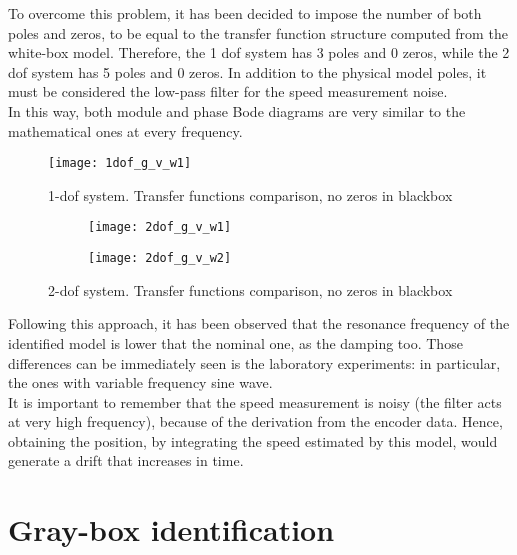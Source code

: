 To overcome this problem, it has been decided to impose the number of both poles and zeros, to be equal to the transfer function structure computed from the white-box model. Therefore, the 1 dof system has 3 poles and 0 zeros, while the 2 dof system has 5 poles and 0 zeros.
In addition to the physical model poles, it must be considered the low-pass filter for the speed measurement noise. \\
In this way, both module and phase Bode diagrams are very similar to the mathematical ones at every frequency.

\begin{figure*}[h]
	\centering
	\texttt{[image: 1dof\_g\_v\_w1]}
	\caption{1-dof system. Transfer functions comparison, no zeros in blackbox}
\end{figure*}

\begin{figure*}[h]
	\centering
	\begin{subfigure}{0.45\columnwidth}
		\texttt{[image: 2dof\_g\_v\_w1]}
	\end{subfigure}
	\begin{subfigure}{0.45\columnwidth}
		\texttt{[image: 2dof\_g\_v\_w2]}
	\end{subfigure}
	\caption{2-dof system. Transfer functions comparison, no zeros in blackbox}
\end{figure*}

Following this approach, it has been observed that the resonance frequency of the identified model is lower that the nominal one, as the damping too.
Those differences can be immediately seen is the laboratory experiments: in particular, the ones with variable frequency sine wave. \\
It is important to remember that the speed measurement is noisy (the filter acts at very high frequency), because of the derivation from the encoder data. Hence, obtaining the position, by integrating the speed estimated by this model, would generate a drift that increases in time. \\


\section{Gray-box identification} \label{sec:gray_b_id}

